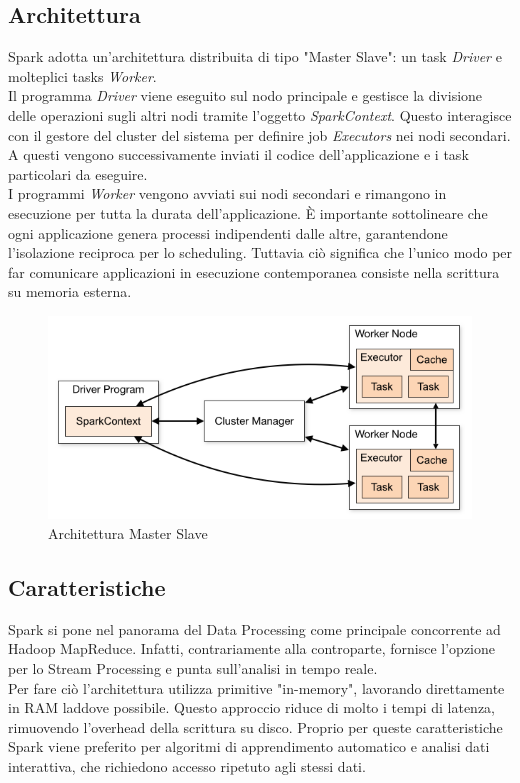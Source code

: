 \subsection{Architettura}
Spark adotta un'architettura distribuita di tipo "Master Slave": un task \textit{Driver} e molteplici tasks \textit{Worker}.\\ 
Il programma \textit{Driver} viene eseguito sul nodo principale e gestisce la divisione delle operazioni sugli altri nodi tramite l'oggetto \textit{SparkContext}. Questo interagisce con il gestore del cluster del sistema per definire job \textit{Executors} nei nodi secondari. A questi vengono successivamente inviati il codice dell'applicazione e i task particolari da eseguire.\\
I programmi \textit{Worker} vengono avviati sui nodi secondari e rimangono in esecuzione per tutta la durata dell'applicazione. È importante sottolineare che ogni applicazione genera processi indipendenti dalle altre, garantendone l'isolazione reciproca per lo scheduling. Tuttavia ciò significa che l'unico modo per far comunicare applicazioni in esecuzione contemporanea consiste nella scrittura su memoria esterna.\\

\begin{figure}[h]
	\centering
	\includegraphics[scale=0.75]{Figures/spark_architecture.png}
	\decoRule
	\caption[Architettura Spark]{Architettura Master Slave}
	\label{fig:Architettura Spark}
\end{figure}

\subsection{Caratteristiche}
Spark si pone nel panorama del Data Processing come principale concorrente ad Hadoop MapReduce. Infatti, contrariamente alla controparte, fornisce l'opzione per lo Stream Processing e punta sull'analisi in tempo reale.\\
Per fare ciò l'architettura utilizza primitive "in-memory", lavorando direttamente in RAM laddove possibile. Questo approccio riduce di molto i tempi di latenza, rimuovendo l'overhead della scrittura su disco. Proprio per queste caratteristiche Spark viene preferito per algoritmi di apprendimento automatico e analisi dati interattiva, che richiedono accesso ripetuto agli stessi dati. \newline

